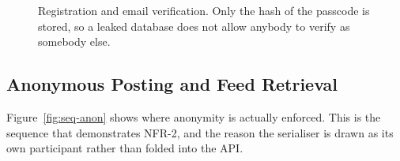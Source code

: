 \documentclass[twoside,12pt]{tietreport}
\begin{document}
\begin{figure}[htbp]
{%
}
\caption[Sequence diagram: registration and email verification]{Registration and
email verification. Only the hash of the passcode is stored, so a leaked database
does not allow anybody to verify as somebody else.}
\label{fig:seq-otp}
\end{figure}

\subsection{Anonymous Posting and Feed Retrieval}

Figure~\ref{fig:seq-anon} shows where anonymity is actually enforced. This is the
sequence that demonstrates NFR-2, and the reason the serialiser is drawn as its
own participant rather than folded into the API.
\end{document}
